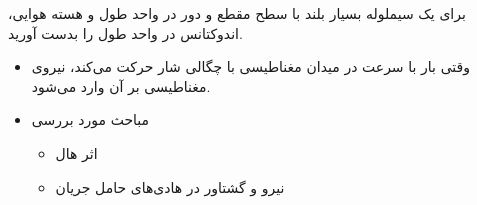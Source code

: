 \begin{ELexample}{}

برای یک سیملوله بسیار بلند با سطح مقطع  و  دور در واحد طول و هسته هوایی، اندوکتانس در واحد طول را بدست آورید.

\begin{ELsolution}


\end{ELsolution}

\end{ELexample}

\ELhold


\begin{ELunit}

\begin{itemize}
\tightlist
\item
  وقتی بار  با سرعت  در میدان مغناطیسی با چگالی شار  حرکت می‌کند، نیروی مغناطیسی  بر آن وارد می‌شود.
\end{itemize}


\begin{itemize}
\tightlist
\item
  مباحث مورد بررسی

  \begin{itemize}
  \tightlist
  \item
    اثر هال 
  \item
    نیرو و گشتاور در هادی‌های حامل جریان
  \end{itemize}
\end{itemize}

\end{ELunit}

\ELhold



